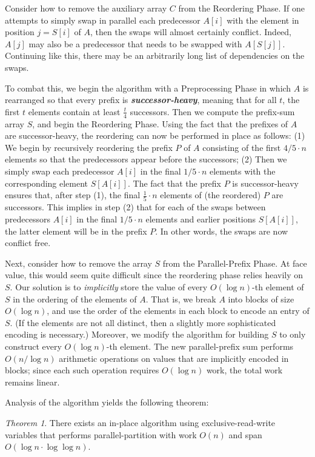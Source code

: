 \documentclass[sigconf]{acmart}
\newcommand{\defn}[1]{{\textit{\textbf{\boldmath #1}}}}
\theoremstyle{remark}
\newtheorem{theorem}{Theorem}[section]
\theoremstyle{remark}
\begin{document}
Consider how to remove the auxiliary array $C$ from the Reordering
Phase. If one attempts to simply swap in parallel each predecessor
$A[i]$ with the element in position $j = S[i]$ of $A$, then the swaps
will almost certainly conflict. Indeed, $A[j]$ may also be a
predecessor that needs to be swapped with $A[S[j]]$. Continuing like
this, there may be an arbitrarily long list of dependencies on the
swaps.

To combat this, we begin the algorithm with a Preprocessing Phase in
which $A$ is rearranged so that every prefix is
\defn{successor-heavy}, meaning that for all $t$, the first $t$
elements contain at least $\frac{t}{4}$ successors. Then we compute
the prefix-sum array $S$, and begin the Reordering Phase. Using the
fact that the prefixes of $A$ are successor-heavy, the reordering can
now be performed in place as follows: (1) We begin by recursively
reordering the prefix $P$ of $A$ consisting of the first $4/5 \cdot n$
elements so that the predecessors appear before the successors; (2)
Then we simply swap each predecessor $A[i]$ in the final $1/5 \cdot n$
elements with the corresponding element $S[A[i]]$. The fact that the
prefix $P$ is successor-heavy ensures that, after step (1), the final 
$\frac{1}{5} \cdot n$ elements of (the reordered) $P$ are successors. 
This implies in step (2) that for each of the swaps between predecessors $A[i]$
in the final $1/5 \cdot n$ elements and earlier positions $S[A[i]]$, the latter
element will be in the prefix $P$. In other words, the swaps are now conflict
free.

Next, consider how to remove the array $S$ from the Parallel-Prefix
Phase. At face value, this would seem quite difficult since the
reordering phase relies heavily on $S$. Our solution is to
\emph{implicitly} store the value of every $O(\log n)$-th element of
$S$ in the ordering of the elements of $A$. That is, we break $A$ into
blocks of size $O(\log n)$, and use the order of the elements in each
block to encode an entry of $S$. (If the elements are not all
  distinct, then a slightly more sophisticated encoding is necessary.)
Moreover, we modify the algorithm for building $S$ to only construct
every $O(\log n)$-th element. The new parallel-prefix sum performs
$O(n / \log n)$ arithmetic operations on values that are implicitly
encoded in blocks; since each such operation requires $O(\log n)$
work, the total work remains linear.

Analysis of the algorithm yields the following theorem:
\begin{theorem}
  \label{thminplace}
  There exists an in-place algorithm using exclusive-read-write
  variables that performs parallel-partition with work $O(n)$ and span
  $O(\log n \cdot \log \log n)$.
\end{theorem}
\end{document}
